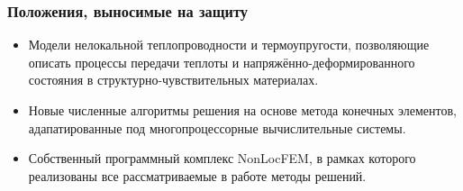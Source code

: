 \begin{frame}
    \frametitle{Положения, выносимые на защиту}
    \begin{itemize}
    	\justifying
        \item Модели нелокальной теплопроводности и термоупругости, позволяющие описать процессы передачи теплоты и напряжённо-деформированного состояния в структурно-чувствительных материалах.
        \item Новые численные алгоритмы решения на основе метода конечных элементов, адапатированные под многопроцессорные вычислительные системы.
        \item Собственный программный комплекс NonLocFEM, в рамках которого реализованы все рассматриваемые в работе методы решений.
    \end{itemize}
\end{frame}
